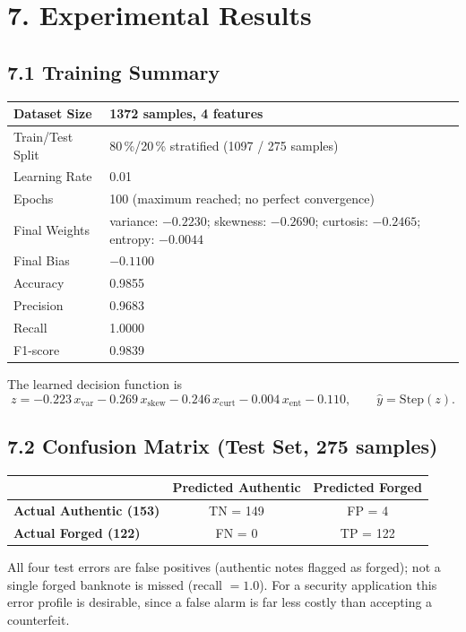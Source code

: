 \documentclass[11pt]{article}
\begin{document}
\section*{7. Experimental Results}
\subsection*{7.1 Training Summary}
\begin{center}
\begin{tabular}{|p{6cm}|p{7cm}|}
\hline
Dataset Size & 1372 samples, 4 features\\ \hline
Train/Test Split & 80\,\%/20\,\% stratified (1097 / 275 samples)\\ \hline
Learning Rate & 0.01\\ \hline
Epochs & 100 (maximum reached; no perfect convergence)\\ \hline
Final Weights & variance: $-0.2230$;\; skewness: $-0.2690$;\; curtosis: $-0.2465$;\; entropy: $-0.0044$\\ \hline
Final Bias & $-0.1100$\\ \hline
Accuracy & 0.9855\\ \hline
Precision & 0.9683\\ \hline
Recall & 1.0000\\ \hline
F1-score & 0.9839\\ \hline
\end{tabular}
\end{center}
The learned decision function is
\[
z = -0.223\,x_{\text{var}} -0.269\,x_{\text{skew}} -0.246\,x_{\text{curt}} -0.004\,x_{\text{ent}} -0.110,
\qquad \hat y=\text{Step}(z).
\]
\subsection*{7.2 Confusion Matrix (Test Set, 275 samples)}
\begin{center}
\begin{tabular}{|l|c|c|}
\hline
 & \textbf{Predicted Authentic} & \textbf{Predicted Forged}\\ \hline
\textbf{Actual Authentic (153)} & TN = 149 & FP = 4\\ \hline
\textbf{Actual Forged (122)} & FN = 0 & TP = 122\\ \hline
\end{tabular}
\end{center}
All four test errors are false positives (authentic notes flagged as forged); not a single forged banknote is missed (recall $=1.0$). For a security application this error profile is desirable, since a false alarm is far less costly than accepting a counterfeit.
\end{document}

